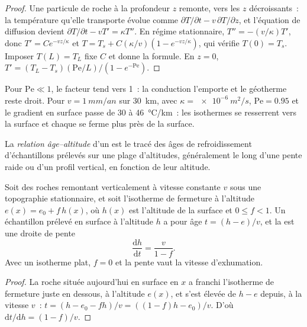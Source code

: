 \begin{proof}
Une particule de roche à la profondeur $z$ remonte, vers les $z$ décroissants~: la
température qu'elle transporte évolue comme $\partial T/\partial t - v\,\partial
T/\partial z$, et l'équation de diffusion devient $\partial T/\partial t - v
T' = \kappa T''$. En régime stationnaire, $T'' = -(v/\kappa)T'$, donc $T' = C
e^{-vz/\kappa}$ et $T = T_s + C(\kappa/v)(1 - e^{-vz/\kappa})$, qui vérifie
$T(0) = T_s$. Imposer $T(L) = T_L$ fixe $C$ et donne la formule. En $z =
0$, $T' = (T_L - T_s)(\mathrm{Pe}/L)/(1 - e^{-\mathrm{Pe}})$.
\end{proof}

Pour $\mathrm{Pe} \ll 1$, le facteur tend vers 1~: la conduction l'emporte et
le géotherme reste droit. Pour $v = \qty{1}{mm/an}$ sur \qty{30}{km}, avec
$\kappa = \qty{e-6}{m^2/s}$, $\mathrm{Pe} = 0.95$ et le gradient en surface
passe de 30 à \qty{46}{\celsius/km}~: les isothermes se resserrent vers la
surface et chaque  se ferme plus près de la surface.

\begin{definition}\label{def:b3:orogenic-wedges:age-elevation}
La \emph{relation âge--altitude} d'un
 est le tracé des âges de refroidissement d'échantillons prélevés sur une
plage d'altitudes, généralement le long d'une pente raide ou d'un profil vertical,
en fonction de leur altitude.
\end{definition}

\begin{proposition}\label{prop:b3:orogenic-wedges:age-elevation}
Soit des roches remontant verticalement à vitesse constante $v$ sous une
topographie stationnaire, et soit l'isotherme de fermeture à l'altitude $e(x) = e_0 +
f\,h(x)$, où $h(x)$ est l'altitude de la surface et $0 \le f < 1$. Un échantillon
prélevé en surface à l'altitude $h$ a pour âge $t = (h - e)/v$,
et la  est une droite de pente
\[
  \frac{\mathrm dh}{\mathrm dt} = \frac{v}{1 - f}.
\]
Avec un isotherme plat, $f = 0$ et la pente vaut la vitesse d'exhumation.
\end{proposition}

\begin{proof}
La roche située aujourd'hui en surface en $x$ a franchi l'isotherme de fermeture juste
en dessous, à l'altitude $e(x)$, et s'est élevée de $h - e$ depuis, à la vitesse $v$~:
$t = (h - e_0 - fh)/v = ((1 - f)h - e_0)/v$. D'où $\mathrm dt/\mathrm dh =
(1 - f)/v$.
\end{proof}

